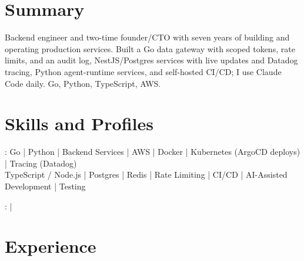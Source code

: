 \documentclass[print]{jack-resume}
\begin{document}
\pagecolor{darkmodeBackground}


\begin{minipage}[t][1cm][t]{.03\textwidth}
    \hfill
\end{minipage}

\section{Summary}
Backend engineer and two-time founder/CTO with seven years of building and operating production services. Built a Go data gateway with scoped tokens, rate limits, and an audit log, NestJS/Postgres services with live updates and Datadog tracing, Python agent-runtime services, and self-hosted CI/CD; I use Claude Code daily. Go, Python, TypeScript, AWS.
\sectionsep

\section{Skills and Profiles}
:
Go \hfill | \hfill
Python \hfill | \hfill
Backend Services \hfill | \hfill
AWS \hfill | \hfill
Docker \hfill | \hfill
Kubernetes (ArgoCD deploys) \hfill | \hfill
Tracing (Datadog) \\
\hspace{1.0cm} TypeScript / Node.js \hfill | \hfill
Postgres \hfill | \hfill
Redis \hfill | \hfill
Rate Limiting \hfill | \hfill
CI/CD \hfill | \hfill
AI-Assisted Development \hfill | \hfill
Testing \\

\raggedright{
    :
      \href{https://www.linkedin.com/in/jack-sturtevant/}{ \ExternalLink} |
     \href{https://github.com/jacksturt}{ \ExternalLink}}

\section{Experience}
\end{document}
